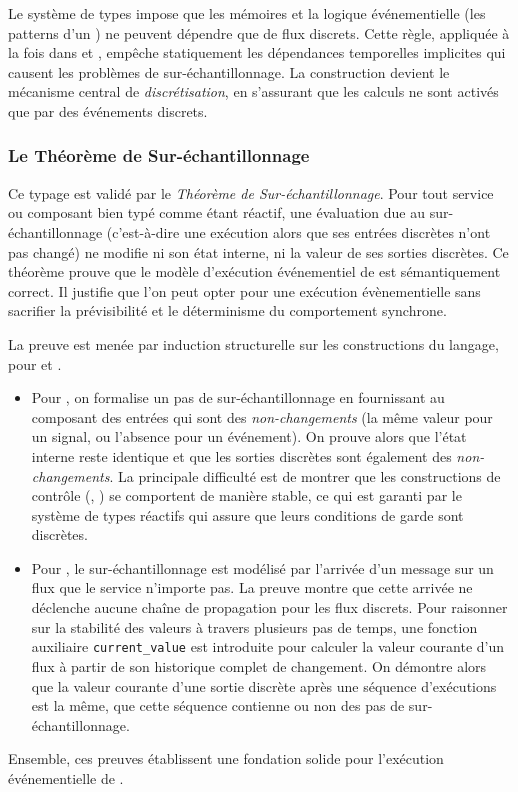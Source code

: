 Le système de types impose que les mémoires  et la logique événementielle (les patterns
d'un ) ne peuvent dépendre que de flux discrets. Cette règle, appliquée à la fois dans
\GRSync et \GRFRP, empêche statiquement les dépendances temporelles implicites qui causent les
problèmes de sur-échantillonnage. La construction  devient le mécanisme central de
\emph{discrétisation}, en s'assurant que les calculs ne sont activés que par des événements discrets.

\subsubsection{Le Théorème de Sur-échantillonnage}

Ce typage est validé par le \emph{Théorème de Sur-échantillonnage}. Pour tout service ou composant
bien typé comme étant réactif, une évaluation due au sur-échantillonnage (c'est-à-dire une exécution
alors que ses entrées discrètes n'ont pas changé) ne modifie ni son état interne, ni la valeur de
ses sorties discrètes. Ce théorème prouve que le modèle d'exécution événementiel de \GRust est
sémantiquement correct. Il justifie que l'on peut opter pour une exécution évènementielle sans
sacrifier la prévisibilité et le déterminisme du comportement synchrone.

La preuve est menée par induction structurelle sur les constructions du langage, pour \GRSync et
\GRFRP.
\begin{itemize}
      \item Pour \GRSync, on formalise un pas de sur-échantillonnage en fournissant au composant des
            entrées qui sont des \emph{non-changements} (la même valeur pour un signal, ou l'absence
            pour un événement). On prouve alors que l'état interne reste identique et que les
            sorties discrètes sont également des \emph{non-changements}. La principale difficulté
            est de montrer que les constructions de contrôle (, ) se comportent
            de manière stable, ce qui est garanti par le système de types réactifs qui assure que
            leurs conditions de garde sont discrètes.

      \item Pour \GRFRP, le sur-échantillonnage est modélisé par l'arrivée d'un message sur un flux
            que le service n'importe pas. La preuve montre que cette arrivée ne déclenche aucune
            chaîne de propagation pour les flux discrets. Pour raisonner sur la stabilité des
            valeurs à travers plusieurs pas de temps, une fonction auxiliaire
            \texttt{current\_value} est introduite pour calculer la valeur courante d'un flux à
            partir de son historique complet de changement. On démontre alors que la valeur courante
            d'une sortie discrète après une séquence d'exécutions est la même, que cette séquence
            contienne ou non des pas de sur-échantillonnage.
\end{itemize}
Ensemble, ces preuves établissent une fondation solide pour l'exécution événementielle de \GRust.

